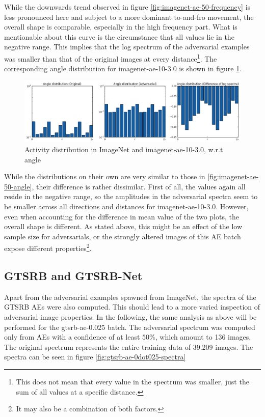 \documentclass[11pt, a4paper]{article}
\begin{document}
While the downwards trend observed in figure \ref{fig:imagenet-ae-50-frequency} is less pronounced here and subject to a more dominant to-and-fro movement, the overall shape is comparable, especially in the high frequency part. What is mentionable about this curve is the circumstance that all values lie in the negative range. This implies that the log spectrum of the adversarial examples was smaller than that of the original images at every distance\footnote{This does not mean that every value in the spectrum was smaller, just the sum of all values at a specific distance.}. The corresponding angle distribution for imagenet-ae-10-3.0 is shown in figure \ref{fig:imagenet-ae-10-3dot0-angle}.

\begin{figure}[h!tb]
	\centering
	\includegraphics[width=\textwidth]{images/spectra/imagenet-ae-10-3dot0-minconfidence-0dot9-maxorig-20000-angle-16-bins.png}
	\caption[Log spectra of ImageNet and strong adversarial examples, angular analysis]{Activity distribution in ImageNet and imagenet-ae-10-3.0, w.r.t angle}
	\label{fig:imagenet-ae-10-3dot0-angle}
\end{figure}

While the distributions on their own are very similar to those in \ref{fig:imagenet-ae-50-angle}, their difference is rather dissimilar. First of all, the values again all reside in the negative range, so the amplitudes in the adversarial spectra seem to be smaller across all directions and distances for imagenet-ae-10-3.0. However, even when accounting for the difference in mean value of the two plots, the overall shape is different. As stated above, this might be an effect of the low sample size for adversarials, or the strongly altered images of this AE batch expose different properties\footnote{It may also be a combination of both factors.}.

\subsection{GTSRB and GTSRB-Net}
Apart from the adversarial examples spawned from ImageNet, the spectra of the GTSRB AEs were also computed. This should lead to a more varied inspection of adversarial image properties. In the following, the same analysis as above will be performed for the gtsrb-ae-0.025 batch. The adversarial spectrum was computed only from AEs with a confidence of at least $50\%$, which amount to 136 images. The original spectrum represents the entire training data of 39.209 images. The spectra can be seen in figure \ref{fig:gtsrb-ae-0dot025-spectra}
\end{document}
